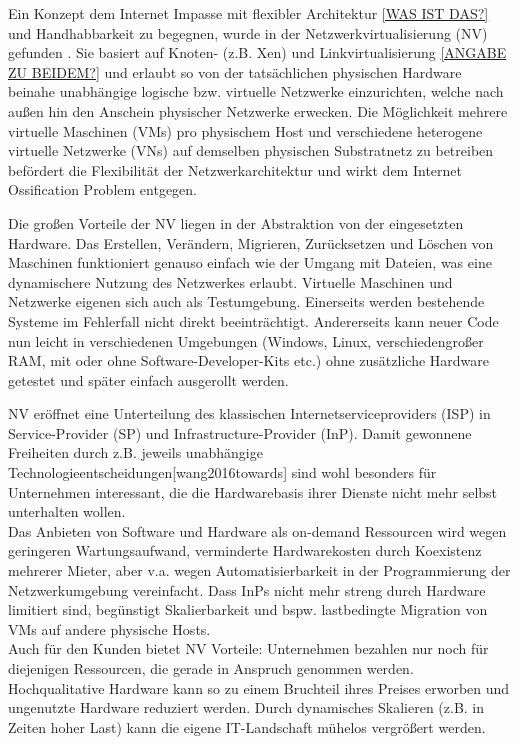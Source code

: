 Ein Konzept dem Internet Impasse mit flexibler Architektur \underline{[WAS IST DAS?]} und Handhabbarkeit zu begegnen, wurde in der Netzwerkvirtualisierung (NV) gefunden \cite{anderson2005overcoming, bays2012security, fischer2013virtual}. Sie basiert auf Knoten- (z.B. Xen) und Linkvirtualisierung \underline{[ANGABE ZU BEIDEM?]} und erlaubt so von der tatsächlichen physischen Hardware beinahe unabhängige logische bzw. virtuelle Netzwerke einzurichten, welche nach außen hin den Anschein physischer Netzwerke erwecken. Die Möglichkeit mehrere virtuelle Maschinen (VMs) pro physischem Host und verschiedene heterogene virtuelle Netzwerke (VNs) auf demselben physischen Substratnetz zu betreiben befördert die Flexibilität der Netzwerkarchitektur und wirkt dem Internet Ossification Problem \cite{anderson2005overcoming} entgegen.

Die großen Vorteile der NV liegen in der Abstraktion von der eingesetzten Hardware. Das Erstellen, Verändern, Migrieren, Zurücksetzen und Löschen von Maschinen funktioniert genauso einfach wie der Umgang mit Dateien, was eine dynamischere Nutzung des Netzwerkes erlaubt. Virtuelle Maschinen und Netzwerke eigenen sich auch als Testumgebung. Einerseits werden bestehende Systeme im Fehlerfall nicht direkt beeinträchtigt. Andererseits kann neuer Code nun leicht in verschiedenen Umgebungen (Windows, Linux, verschiedengroßer RAM, mit oder ohne Software-Developer-Kits etc.) ohne zusätzliche Hardware getestet und später einfach ausgerollt werden.

NV eröffnet eine Unterteilung des klassischen Internetserviceproviders (ISP) in Service-Provider (SP) und Infrastructure-Provider (InP). Damit gewonnene Freiheiten durch z.B. jeweils unabhängige Technologieentscheidungen[wang2016towards] sind wohl besonders für Unternehmen interessant, die die Hardwarebasis ihrer Dienste nicht mehr selbst unterhalten wollen.\\
Das Anbieten von Software und Hardware als on-demand Ressourcen wird wegen geringeren Wartungsaufwand, verminderte Hardwarekosten durch Koexistenz mehrerer Mieter, aber v.a. wegen Automatisierbarkeit in der Programmierung der Netzwerkumgebung vereinfacht. Dass InPs nicht mehr streng durch Hardware limitiert sind, begünstigt Skalierbarkeit und bspw. lastbedingte Migration von VMs auf andere physische Hosts.\\
Auch für den Kunden bietet NV Vorteile: Unternehmen bezahlen nur noch für diejenigen Ressourcen, die gerade in Anspruch genommen werden. Hochqualitative Hardware kann so zu einem Bruchteil ihres Preises erworben und ungenutzte Hardware reduziert werden. Durch dynamisches Skalieren (z.B. in Zeiten hoher Last) kann die eigene IT-Landschaft mühelos vergrößert werden.

